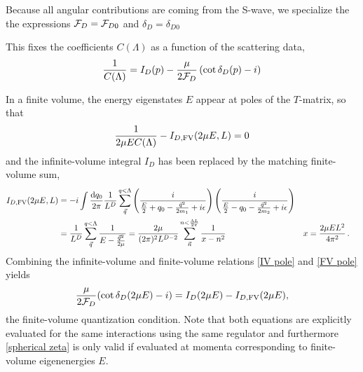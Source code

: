 Because all angular contributions are coming from the S-wave, we specialize the the expressions $\mathcal{F}_{D} = \mathcal{F}_{D0}$ and $\delta_{D} = \delta_{D0}$

This fixes the coefficients $C(\Lambda)$ as a function of the scattering data,
\begin{equation}\label{eq:IV pole}
    \frac{1}{C(\Lambda)}
    =
    I_D(p) - \frac{\mu}{2 \mathcal{F}_{D}}\left(\cot \delta_{D}(p) - i\right)
\end{equation}

In a finite volume, the energy eigenstates $E$ appear at poles of the $T$-matrix, so that
\begin{equation}\label{eq:FV pole}
    \frac{1}{2\mu E C(\Lambda) } - I_{D, \textrm{FV}}(2\mu E,L) = 0
\end{equation}
and the infinite-volume integral $I_D$ has been replaced by the matching finite-volume sum,
\begin{align}
I_{D,\textrm{FV}}(2\mu E,L)
    &=-i\int \frac { \mathrm {d}q_0}{2\pi} \frac{1}{L^D}\sum_{\vec{q}}^{q < \Lambda} \left( \frac { i } { \frac{E}{2} + q _ { 0 } - \frac{\vec{q}^2}{2m_1} + i \epsilon } \right) \left( \frac { i } { \frac{E}{2} - q _ { 0 } - \frac{\vec{q}^2}{2m_2} + i \epsilon } \right)
    \\
    \label{eq:I0 FV}
    &=\frac{1}{L^D}\sum_{\vec{q}}^{q < \Lambda} \frac { 1 } { E - \frac{\vec{q}^2}{2\mu} }
    =\frac{2\mu}{(2\pi)^2 L^{D-2}} \sum_{\vec{n}}^{n < \frac{\Lambda L}{2\pi}} \frac{1}{x-n^2}
    &
    x &= \frac{2\mu E L^2}{4\pi^2}
    \, .
\end{align}
Combining the infinite-volume and finite-volume relations \eqref{IV pole} and \eqref{FV pole} yields
\begin{equation}\label{eq:spherical zeta}
    \frac{\mu}{2\mathcal{F}_{D}}(\cot\delta_{D}(2\mu E)-i) = I_D(2\mu E) - I_{D,\textrm{FV}}(2\mu E),
\end{equation}
the finite-volume quantization condition.
Note that both equations are explicitly evaluated for the same interactions using the same regulator and furthermore \eqref{spherical zeta} is only valid if evaluated at momenta corresponding to finite-volume eigenenergies $E$.

